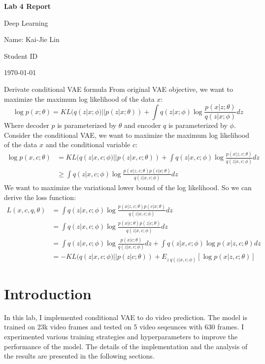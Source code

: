 \documentclass{article} %
\newcommand{\question}[2][]{\begin{flushleft}\textbf{Question #1}: \textit{#2}\end{flushleft}}
\newcommand{\maketitletwo}[2][]{\begin{center}
        \Large{\textbf{Lab 4 Report}
        
            Deep Learning} %
        \vspace{5pt}
        
        \normalsize{
            Name: Kai-Jie Lin 
            
            Student ID\: 110652019
            
            \today}
        \vspace{15pt}
        \end{center}}
\begin{document}
    \maketitletwo[5]  %
    
    \section{Derivate conditional VAE formula}
    From original VAE objective, we want to maximize the maximum log likelihood of the data $x$:
    \[
    \log p(x;\theta) = KL(q(z|x;\phi)||p(z|x;\theta)) + \int q(z|x;\phi) \log \frac{p(x|z;\theta)}{q(z|x;\phi)}  dz
    \]
    Where decoder $p$ is parameterized by $\theta$ and encoder $q$ is parameterized by $\phi$.\\
    Consider the conditional VAE, we want to maximize the maximum log likelihood of the data $x$ and the conditional variable $c$:
    \[
        \begin{aligned}
            \log p(x,c;\theta) 
            &= KL(q(z|x,c;\phi)||p(z|x,c;\theta)) + \int q(z|x,c;\phi) \log \frac{p(x|z,c;\theta)}{q(z|x,c;\phi)}  dz \\
            &\geq \int q(z|x,c;\phi) \log \frac{p(x|z,c;\theta)p(c|x;\theta)}{q(z|x,c;\phi)}  dz
        \end{aligned}
    \]
    We want to maximize the variational lower bound of the log likelihood. So we can derive the loss function:
    \[
        \begin{aligned}
            L(x, c, q, \theta) 
            &= \int q(z|x,c;\phi) \log \frac{p(x|z,c;\theta)p(c|x;\theta)}{q(z|x,c;\phi)}  dz \\ 
            &= \int q(z|x,c;\phi) \log \frac{p(x|c;\theta)p(z|c;\theta)}{q(z|x,c;\phi)}  dz \\
            &= \int q(z|x,c;\phi) \log \frac{p(x|c;\theta)}{q(z|x,c;\phi)}  dz + \int q(z|x,c;\phi) \log p(x|z,c;\theta)  dz \\
            &= -KL(q(z|x,c;\phi)||p(z|c;\theta)) + E_{z~q(z|x,c;\phi)}[\log p(x|z,c;\theta)]
        \end{aligned}
    \]

    \section{Introduction}
    In this lab, I implemented conditional VAE to do video prediction. 
    The model is trained on 23k video frames and tested on 5 video seqeunces with 630 frames.
    I experimented various training strategies and hyperparameters to improve the performance of the model.
    The details of the implementation and the analysis of the results are presented in the following sections.
    
\end{document}
